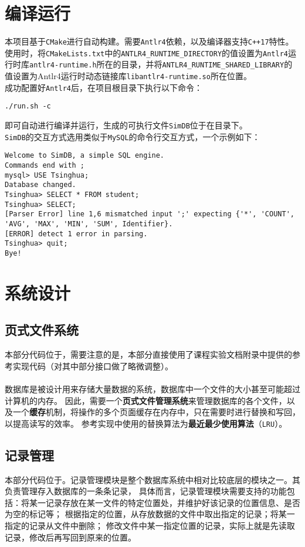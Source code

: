 \documentclass[11pt]{article}
\begin{document}
\section{编译运行}
本项目基于\texttt{CMake}进行自动构建。需要\texttt{Antlr4}依赖，以及编译器支持\texttt{C++17}特性。
使用时，将\texttt{CMakeLists.txt}中的\texttt{ANTLR4\_RUNTIME\_DIRECTORY}的值设置为\texttt{Antlr4}运行时库\texttt{antlr4-runtime.h}所在的目录，并将\texttt{ANTLR4\_RUNTIME\_SHARED\_LIBRARY}的值设置为Antlr4运行时动态链接库\texttt{libantlr4-runtime.so}所在位置。\\
成功配置好\texttt{Antlr4}后，在项目根目录下执行以下命令：
\begin{verbatim}
./run.sh -c
\end{verbatim}
即可自动进行编译并运行，生成的可执行文件\texttt{SimDB}位于在目录下。\\

\texttt{SimDB}的交互方式选用类似于\texttt{MySQL}的命令行交互方式，一个示例如下：
\begin{verbatim}
Welcome to SimDB, a simple SQL engine.
Commands end with ;
mysql> USE Tsinghua;
Database changed.
Tsinghua> SELECT * FROM student;
Tsinghua> SELECT;
[Parser Error] line 1,6 mismatched input ';' expecting {'*', 'COUNT', 
'AVG', 'MAX', 'MIN', 'SUM', Identifier}.
[ERROR] detect 1 error in parsing.
Tsinghua> quit;
Bye!
\end{verbatim}

\section{系统设计}
\subsection{页式文件系统}
本部分代码位于，需要注意的是，本部分直接使用了课程实验文档附录中提供的参考实现代码（对其中部分接口做了略微调整）。\\\\
数据库是被设计用来存储大量数据的系统，数据库中一个文件的大小甚至可能超过计算机的内存。
因此，需要一个\textbf{页式文件管理系统}来管理数据库的各个文件，以及一个\textbf{缓存}机制，将操作的多个页面缓存在内存中，只在需要时进行替换和写回，以提高读写的效率。
参考实现中使用的替换算法为\textbf{最近最少使用算法}（\texttt{LRU}）。

\subsection{记录管理}
本部分代码位于。记录管理模块是整个数据库系统中相对比较底层的模块之一。其负责管理存入数据库的一条条记录，
具体而言，记录管理模块需要支持的功能包括：将某一记录存放在某一文件的特定位置处，并维护好该记录的位置信息、是否为空的标记等；
根据指定的位置，从存放数据的文件中取出指定的记录；将某一指定的记录从文件中删除；
修改文件中某一指定位置的记录，实际上就是先读取记录，修改后再写回到原来的位置。\\
\end{document}
